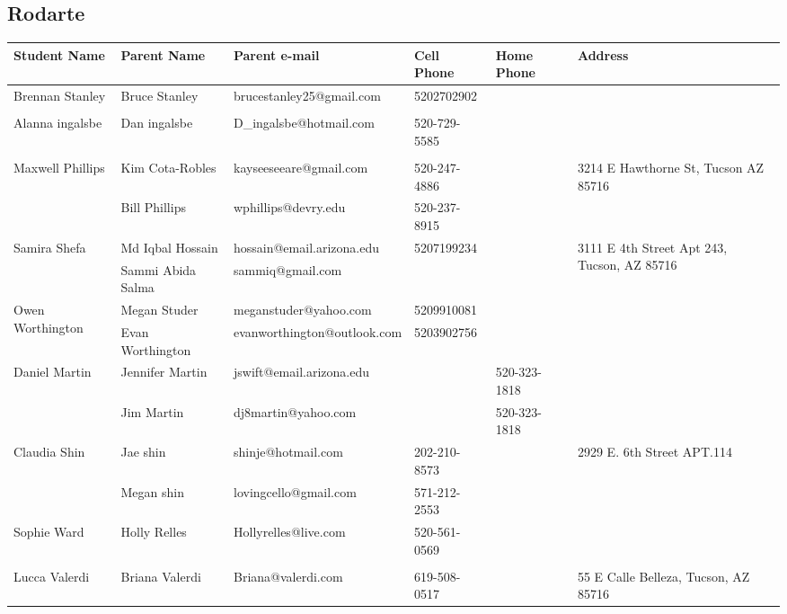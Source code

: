 \documentclass[landscape]{article}\usepackage[]{graphicx}\usepackage[]{color}
\begin{document}
\subsection{Rodarte}
\begin{longtable}{p{70pt}|p{75pt}|p{120pt}|p{60pt}|p{60pt}|p{120pt}|}
Student Name & Parent Name & Parent e-mail & Cell Phone & Home Phone & Address\\
\hline
\multirow{2}{70pt}{Brennan Stanley} & Bruce Stanley & brucestanley25@gmail.com & 5202702902 &  & \multirow{2}{100pt}{} \\
 &  &  &  &  & \\
\hline
\multirow{2}{70pt}{Alanna ingalsbe} & Dan ingalsbe & D\_ingalsbe@hotmail.com & 520-729-5585 &  & \multirow{2}{100pt}{} \\
 &  &  &  &  & \\
\hline
\multirow{2}{70pt}{Maxwell Phillips} & Kim Cota-Robles & kayseeseeare@gmail.com & 520-247-4886 &  & \multirow{2}{100pt}{3214 E Hawthorne St, Tucson AZ 85716} \\
 & Bill Phillips & wphillips@devry.edu & 520-237-8915 &  & \\
\hline
\multirow{2}{70pt}{Samira Shefa} & Md Iqbal Hossain & hossain@email.arizona.edu & 5207199234 &  & \multirow{2}{100pt}{3111 E 4th Street Apt 243, Tucson, AZ 85716} \\
 & Sammi Abida Salma & sammiq@gmail.com &  &  & \\
\hline
\multirow{2}{70pt}{Owen Worthington} & Megan Studer & meganstuder@yahoo.com & 5209910081 &  & \multirow{2}{100pt}{} \\
 & Evan Worthington & evanworthington@outlook.com & 5203902756 &  & \\
\hline
\multirow{2}{70pt}{Daniel Martin} & Jennifer Martin & jswift@email.arizona.edu &  & 520-323-1818 & \multirow{2}{100pt}{} \\
 & Jim Martin & dj8martin@yahoo.com &  & 520-323-1818 & \\
\hline
\multirow{2}{70pt}{Claudia Shin} & Jae shin & shinje@hotmail.com & 202-210-8573 &  & \multirow{2}{100pt}{2929 E. 6th Street APT.114} \\
 & Megan shin & lovingcello@gmail.com & 571-212-2553 &  & \\
\hline
\multirow{2}{70pt}{Sophie Ward} & Holly Relles & Hollyrelles@live.com & 520-561-0569 &  & \multirow{2}{100pt}{} \\
 &  &  &  &  & \\
\hline
\multirow{2}{70pt}{Lucca Valerdi} & Briana Valerdi & Briana@valerdi.com & 619-508-0517 &  & \multirow{2}{100pt}{55 E Calle Belleza, Tucson, AZ 85716} \\

\end{longtable}
\end{document}
